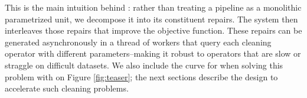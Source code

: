 This is the main intuition behind \sys: rather than treating a pipeline as a monolithic parametrized unit, we decompose it into its constituent repairs.
The system then interleaves those repairs that improve the objective function.
These repairs can be generated asynchronously in a thread of workers that query each cleaning operator with different parameters--making it robust to operators that are slow or straggle on difficult datasets.
We also include the curve for when solving this problem with \sys on Figure \ref{fig:teaser}; the next sections describe the design to accelerate such cleaning problems.









